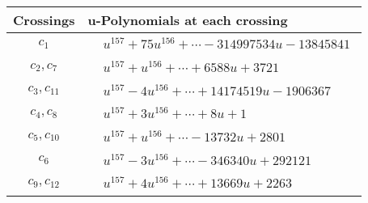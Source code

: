 \documentclass[1p]{elsarticle_modified}
\theoremstyle{definition}
\begin{document}
\begin{tabular}{m{50pt}|m{274pt}}
Crossings & \hspace{64pt}u-Polynomials at each crossing \\
\hline $$\begin{aligned}c_{1}\end{aligned}$$&$\begin{aligned}
&u^{157}+75 u^{156}+\cdots-314997534 u-13845841
\end{aligned}$\\
\hline $$\begin{aligned}c_{2},c_{7}\end{aligned}$$&$\begin{aligned}
&u^{157}+u^{156}+\cdots+6588 u+3721
\end{aligned}$\\
\hline $$\begin{aligned}c_{3},c_{11}\end{aligned}$$&$\begin{aligned}
&u^{157}-4 u^{156}+\cdots+14174519 u-1906367
\end{aligned}$\\
\hline $$\begin{aligned}c_{4},c_{8}\end{aligned}$$&$\begin{aligned}
&u^{157}+3 u^{156}+\cdots+8 u+1
\end{aligned}$\\
\hline $$\begin{aligned}c_{5},c_{10}\end{aligned}$$&$\begin{aligned}
&u^{157}+u^{156}+\cdots-13732 u+2801
\end{aligned}$\\
\hline $$\begin{aligned}c_{6}\end{aligned}$$&$\begin{aligned}
&u^{157}-3 u^{156}+\cdots-346340 u+292121
\end{aligned}$\\
\hline $$\begin{aligned}c_{9},c_{12}\end{aligned}$$&$\begin{aligned}
&u^{157}+4 u^{156}+\cdots+13669 u+2263
\end{aligned}$\\
\hline
\end{tabular}\\~\\
\end{document}

